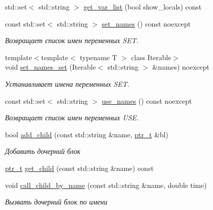 \begin{DoxyCompactItemize}
\item 
std\-::set$<$ std\-::string $>$ \hyperlink{classLIBKMS__namespace_1_1Block_af3cf3e07e2ea977d1b125abb6a5da96a}{get\-\_\-var\-\_\-list} (bool show\-\_\-locals) const 
\item 
const std\-::set$<$ std\-::string $>$ \hyperlink{classLIBKMS__namespace_1_1Block_ab0208151cac031b7d0465e5d80e4fd7e}{set\-\_\-names} () const noexcept
\begin{DoxyCompactList}\small\item\em Возвращает список имен переменных S\-E\-T. \end{DoxyCompactList}\item 
{\footnotesize template$<$template$<$ typename T $>$ class Iterable$>$ }\\void \hyperlink{classLIBKMS__namespace_1_1Block_a7578ee18a28d988ab83c2caad09b51d6}{set\-\_\-names\-\_\-set} (Iterable$<$ std\-::string $>$ \&names) noexcept
\begin{DoxyCompactList}\small\item\em Устанавливает имена переменных S\-E\-T. \end{DoxyCompactList}\item 
const std\-::set$<$ std\-::string $>$ \hyperlink{classLIBKMS__namespace_1_1Block_a29bbb63c82a1ca44dca3a879db824592}{use\-\_\-names} () const noexcept
\begin{DoxyCompactList}\small\item\em Возвращает список имен переменных U\-S\-E. \end{DoxyCompactList}\item 
bool \hyperlink{classLIBKMS__namespace_1_1Block_a2f86d7c526553e42af091402bd86670b}{add\-\_\-child} (const std\-::string \&name, \hyperlink{classLIBKMS__namespace_1_1Block_a85039a495a9c40a4425de6a5291decbe}{ptr\-\_\-t} \&bl)
\begin{DoxyCompactList}\small\item\em Добавить дочерний блок \end{DoxyCompactList}\item 
\hyperlink{classLIBKMS__namespace_1_1Block_a85039a495a9c40a4425de6a5291decbe}{ptr\-\_\-t} \hyperlink{classLIBKMS__namespace_1_1Block_ad78d26bc20dd3a2fbb064881c9a05be2}{get\-\_\-child} (const std\-::string \&name) const 
\item 
void \hyperlink{classLIBKMS__namespace_1_1Block_a346b2b894e22b139665a4c14b4c39ca7}{call\-\_\-child\-\_\-by\-\_\-name} (const std\-::string \&name, double time)
\begin{DoxyCompactList}\small\item\em Вызвать дочерний блок по имени \end{DoxyCompactList}\item 

\end{DoxyCompactItemize}
